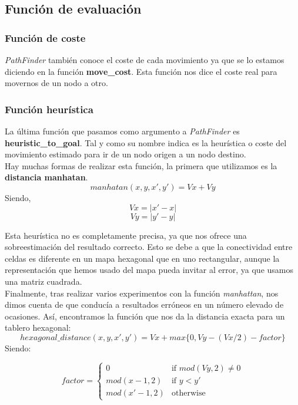 \documentclass[a4paper,12pt,oneside]{book}
\begin{document}
\subsection{Función de evaluación}

\subsubsection{Función de coste}

{\it PathFinder} también conoce el coste de cada movimiento ya que se
lo estamos diciendo en la función {\bf move\_cost}. Esta función nos
dice el coste real para movernos de un nodo a otro. 

\subsubsection{Función heurística}

La última función que pasamos como argumento a {\it PathFinder} es
{\bf heuristic\_to\_goal}. Tal y como su nombre indica es la
heurística o coste del movimiento estimado para ir de un nodo origen a
un nodo destino.\\

Hay muchas formas de realizar esta función, la primera que utilizamos
es la {\bf distancia manhatan}.
$$ manhatan(x,y, x',y') = Vx + Vy $$
Siendo,
$$Vx = |x'-x| $$
$$Vy = |y'-y| $$

 Esta heurística no es completamente precisa, ya que  nos ofrece una
 sobreestimación del resultado correcto. Esto se debe a que la
 conectividad entre celdas es diferente en un mapa hexagonal que en
 uno rectangular, aunque la representación que hemos usado del mapa
 pueda invitar al error, ya que usamos una matriz cuadrada.\\

Finalmente, tras realizar varios experimentos con la función {\it
  manhattan}, nos dimos cuenta de que conducía a resultados erróneos
en un número elevado de ocasiones. Así, encontramos la función que nos
da la distancia exacta para un tablero hexagonal:
$$ hexagonal\_distance(x,y, x',y') = Vx + max \{0, Vy- (Vx/2) -
  factor\}  $$
Siendo:

$$ factor = \left \{ \begin{matrix} 0 & \mbox{if }mod(Vy,2) \ne 0 
\\ mod(x-1,2) & \mbox{if } y < y'
\\ mod(x'-1,2) & \mbox{otherwise } \end{matrix} \right. $$
\end{document}
